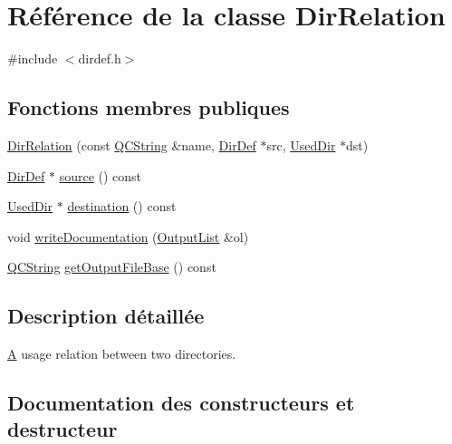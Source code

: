 \hypertarget{class_dir_relation}{}\section{Référence de la classe Dir\+Relation}
\label{class_dir_relation}


{\ttfamily \#include $<$dirdef.\+h$>$}

\subsection*{Fonctions membres publiques}
\begin{DoxyCompactItemize}
\item 
\hyperlink{class_dir_relation_a2d86d0c822e9dbb36c1997ed81bcce77}{Dir\+Relation} (const \hyperlink{class_q_c_string}{Q\+C\+String} \&name, \hyperlink{class_dir_def}{Dir\+Def} $\ast$src, \hyperlink{class_used_dir}{Used\+Dir} $\ast$dst)
\item 
\hyperlink{class_dir_def}{Dir\+Def} $\ast$ \hyperlink{class_dir_relation_a0b67122187becad2984b437a26f3a996}{source} () const 
\item 
\hyperlink{class_used_dir}{Used\+Dir} $\ast$ \hyperlink{class_dir_relation_a8b027ae8a056b8c74eca5e786b9128b7}{destination} () const 
\item 
void \hyperlink{class_dir_relation_a5fa861050993dafb351589f2f1c05326}{write\+Documentation} (\hyperlink{class_output_list}{Output\+List} \&ol)
\item 
\hyperlink{class_q_c_string}{Q\+C\+String} \hyperlink{class_dir_relation_a425f7b71a253a7b62001eb301ef5de29}{get\+Output\+File\+Base} () const 
\end{DoxyCompactItemize}


\subsection{Description détaillée}
\hyperlink{class_a}{A} usage relation between two directories. 

\subsection{Documentation des constructeurs et destructeur}
\hypertarget{class_dir_relation_a2d86d0c822e9dbb36c1997ed81bcce77}{}
